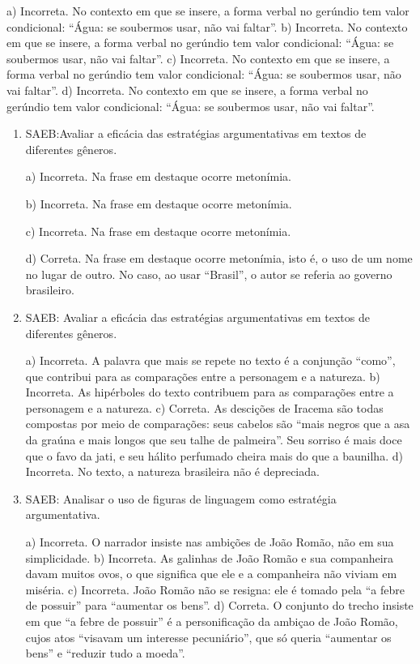\begin{enumerate}
a) Incorreta. No contexto em que se insere, a forma verbal no gerúndio tem valor condicional: 
``Água: se soubermos usar, não vai faltar''. 
b) Incorreta. No contexto em que se insere, a forma verbal no gerúndio tem valor condicional: 
``Água: se soubermos usar, não vai faltar''. 
c) Incorreta. No contexto em que se insere, a forma verbal no gerúndio tem valor condicional: 
``Água: se soubermos usar, não vai faltar''.
d) Incorreta. No contexto em que se insere, a forma verbal no gerúndio tem valor condicional: 
``Água: se soubermos usar, não vai faltar''.

\end{enumerate}


\begin{enumerate}

\item
SAEB:Avaliar a eficácia das estratégias argumentativas em textos de
diferentes gêneros.

a) Incorreta. Na frase em destaque ocorre metonímia.

b) Incorreta. Na frase em destaque ocorre metonímia.

c) Incorreta. Na frase em destaque ocorre metonímia.

d) Correta. Na frase em destaque ocorre metonímia, isto é, o uso de um nome no lugar de outro. 
No caso, ao usar ``Brasil'', o autor se referia ao governo brasileiro.

\item
SAEB: Avaliar a eficácia das estratégias argumentativas em textos de
diferentes gêneros.

a) Incorreta. A palavra que mais se repete no texto é a conjunção ``como'', que contribui
para as comparações entre a personagem e a natureza.
b) Incorreta. As hipérboles do texto contribuem
para as comparações entre a personagem e a natureza.
c) Correta. As descições de Iracema são todas compostas por meio de comparações:
seus cabelos são ``mais negros que a asa da graúna e mais longos
que seu talhe de palmeira''. Seu sorriso é mais doce que o favo da jati,
e seu hálito perfumado cheira mais do que a baunilha. 
d) Incorreta. No texto, a natureza brasileira não é depreciada.

\item
SAEB: Analisar o uso de figuras de linguagem como estratégia argumentativa.

a) Incorreta. O narrador insiste nas ambições de João Romão, não em sua simplicidade.
b) Incorreta. As galinhas de João Romão e sua companheira davam muitos ovos, o que significa 
que ele e a companheira não viviam em miséria.
c) Incorreta. João Romão não se resigna: ele é tomado pela ``a febre de possuir'' para ``aumentar 
os bens''.
d) Correta. O conjunto do trecho insiste em que ``a febre de possuir'' é a personificação da 
ambiçao de João Romão, cujos atos ``visavam um interesse pecuniário'', que só queria ``aumentar 
os bens'' e ``reduzir tudo a moeda''.

\end{enumerate}

